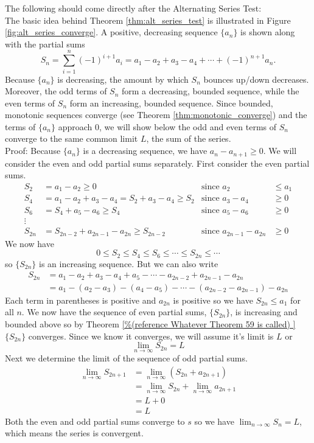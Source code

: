 \documentclass[10pt]{article}
\newcommand{\ds}{\displaystyle}
\begin{document}
The following should come directly after the Alternating Series Test:\\


The basic idea behind Theorem \ref{thm:alt_series_test} is illustrated in Figure \ref{fig:alt_series_converge}. A positive, decreasing sequence $\{a_n\}$ is shown along with the partial sums
$$S_n = \sum_{i=1}^n(-1)^{i+1}a_i =a_1-a_2+a_3-a_4+\cdots+(-1)^{n+1}a_n.$$ 
Because $\{a_n\}$ is decreasing, the amount by which $S_n$ bounces up/down decreases. Moreover, the odd terms of $S_n$ form a decreasing, bounded sequence, while the even terms of $S_n$ form an increasing, bounded sequence. Since bounded, monotonic sequences converge (see Theorem \ref{thm:monotonic_converge}) and the terms of $\{a_n\}$ approach 0, we will show below the odd and even terms of $S_n$ converge to the same common limit $L$, the sum of the series.\\


Proof:
Because $\{a_n\}$ is a decreasing sequence, we have $a_n-a_{n+1}\geq 0$. 
We will consider the even and odd partial sums separately. First consider the even partial sums.
\begin{align*}
S_2&=a_1-a_2\geq 0  &\text{since } a_2&\leq a_1\\
S_4&=a_1-a_2+a_3-a_4=S_2+a_3-a_4\geq S_2 &\text{since } a_3- a_4&\geq 0\\
S_6&=S_4+a_5-a_6\geq S_4 &\text{since } a_5- a_6&\geq 0\\
\vdots \\
S_{2n}&=S_{2n-2}+a_{2n-1}-a_{2n}\geq S_{2n-2}  &\text{since } a_{2n-1}- a_{2n}&\geq 0
\end{align*}
We now have $$0\leq S_2\leq S_4\leq S_6\leq  \cdots \leq S_{2n}\leq \cdots$$ so $\{S_{2n}\}$ is an increasing sequence. 
But we can also write 
\begin{align*}
S_{2n}&=a_1-a_2+a_3-a_4+a_5-\cdots -a_{2n-2}+a_{2n-1}-a_{2n}\\
&=a_1-(a_2-a_3)-(a_4-a_5)-\cdots -(a_{2n-2}-a_{2n-1})-a_{2n}
\end{align*}
Each term in parentheses is positive and $a_{2n}$ is positive so we have $S_{2n}\leq a_1$ for all $n$. We now have the sequence of even partial sums, $\{S_{2n}\}$, is increasing and bounded above so by Theorem \ref{%
}
 $\{S_{2n}\}$ converges. Since we know it converges, we will assume it's limit is $L$ or $$\lim_{n\to \infty}S_{2n}=L$$
Next we determine the limit of the sequence of odd partial sums.
\begin{align*}
\lim_{n\to \infty}S_{2n+1}&=\lim_{n\to \infty}(S_{2n}+a_{2n+1})\\
&=\lim_{n\to \infty}S_{2n}+\lim_{n\to \infty}a_{2n+1}\\
&=L+0\\
&=L
\end{align*}
Both the even and odd partial sums converge to $s$ so we have $\ds \lim_{n\to \infty}S_n=L$, which means the series is convergent.
\end{document}
